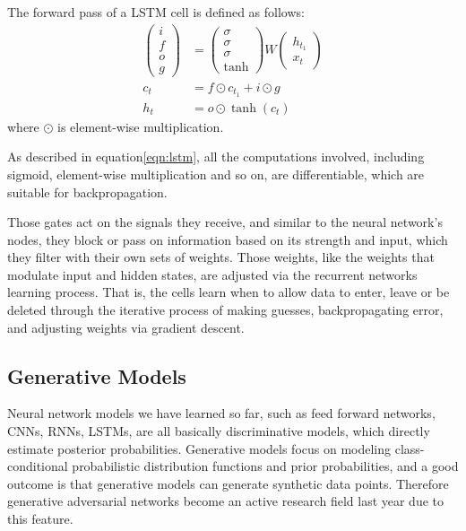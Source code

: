 \documentclass{article} %
\begin{document}
The forward pass of a LSTM cell is defined as follows:
\begin{equation}
\begin{split}
\left(\begin{array}{c} i\\f\\o\\g \end{array}\right) &= \left(\begin{array}{c} \sigma\\\sigma\\\sigma\\\tanh \end{array}\right) W \left(\begin{array}{c} h_{t_1}\\x_t \end{array}\right)  \\  
c_t &= f \odot c_{t_1} + i \odot g\\
h_t &= o \odot \tanh(c_t)
\end{split}
\label{eqn:lstm}
\end{equation}
where $\odot$ is element-wise multiplication.

As described in equation\eqref{eqn:lstm}, all the computations involved, including sigmoid,  element-wise multiplication and so on, are differentiable, which are suitable for backpropagation. 

Those gates act on the signals they receive, and similar to the neural network’s nodes, they block or pass on information based on its strength and input, which they filter with their own sets of weights. Those weights, like the weights that modulate input and hidden states, are adjusted via the recurrent networks learning process. That is, the cells learn when to allow data to enter, leave or be deleted through the iterative process of making guesses, backpropagating error, and adjusting weights via gradient descent.

\subsection{Generative Models}
Neural network models we have learned so far, such as feed forward networks, CNNs, RNNs, LSTMs, are all basically discriminative models, which directly estimate posterior probabilities. Generative models focus on modeling class-conditional probabilistic distribution functions and prior probabilities, and a good outcome is that generative models can generate synthetic data points. Therefore generative adversarial networks become an active research field last year due to this feature. 
\end{document}
